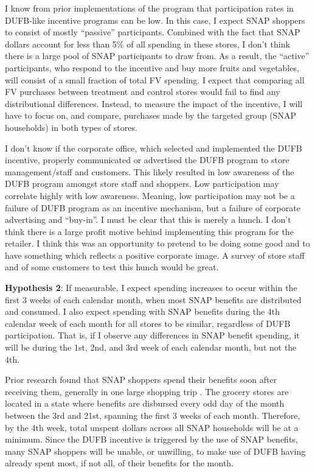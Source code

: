 \documentclass[12pt,letterpaperpaper,]{book}
\begin{document}
I know from prior implementations of the program that participation
rates in DUFB-like incentive programs can be low. In this case, I expect
SNAP shoppers to consist of mostly ``passive'' participants. Combined
with the fact that SNAP dollars account for less than 5\% of all
spending in these stores, I don't think there is a large pool of SNAP
participants to draw from. As a result, the ``active'' participants, who
respond to the incentive and buy more fruits and vegetables, will
consist of a small fraction of total FV spending. I expect that
comparing all FV purchases between treatment and control stores would
fail to find any distributional differences. Instead, to measure the
impact of the incentive, I will have to focus on, and compare, purchases
made by the targeted group (SNAP households) in both types of stores.

I don't know if the corporate office, which selected and implemented the
DUFB incentive, properly communicated or advertised the DUFB program to
store management/staff and customers. This likely resulted in low
awareness of the DUFB program amongst store staff and shoppers. Low
participation may correlate highly with low awareness. Meaning, low
participation may not be a failure of DUFB program as an incentive
mechanism, but a failure of corporate advertising and ``buy-in''. I must
be clear that this is merely a hunch. I don't think there is a large
profit motive behind implementing this program for the retailer. I think
this was an opportunity to pretend to be doing some good and to have
something which reflects a positive corporate image. A survey of store
staff and of some customers to test this hunch would be great.

\textbf{Hypothesis 2}: If measurable, I expect spending increases to
occur within the first 3 weeks of each calendar month, when most SNAP
benefits are distributed and consumed. I also expect spending with SNAP
benefits during the 4th calendar week of each month for all stores to be
similar, regardless of DUFB participation. That is, if I observe any
differences in SNAP benefit spending, it will be during the 1st, 2nd,
and 3rd week of each calendar month, but not the 4th.

Prior research found that SNAP shoppers spend their benefits soon after
receiving them, generally in one large shopping trip
\citep{wiig_art_2009, damon_first_2013}. The grocery stores are located
in a state where benefits are disbursed every odd day of the month
between the 3rd and 21st, spanning the first 3 weeks of each month.
Therefore, by the 4th week, total unspent dollars across all SNAP
households will be at a minimum. Since the DUFB incentive is triggered
by the use of SNAP benefits, many SNAP shoppers will be unable, or
unwilling, to make use of DUFB having already spent most, if not all, of
their benefits for the month.
\end{document}
